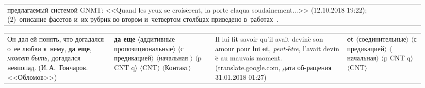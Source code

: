\begin{multicols}{2}
\begin{enumerate}[(1)]
\begin{table*}
\begin{center}
\begin{tabular}{|p{57mm}|p{23mm}|p{38mm}|p{25mm}|}
{предлагаемый системой GNMT: <<Quand les yeux se crois$\grave{\mbox{e}}$rent, la porte claqua 
soudainement$\ldots$>> (12.10.2018 19:22);
(2)~описание фасетов и~их рубрик во втором и~четвертом столбцах 
приведено в~работах~\cite{8-gz, 17-gz}.}
    \end{tabular}
    \end{center}
\begin{center}
\vspace*{2ex}


\begin{tabular}{|p{50.2mm}|p{31mm}|p{42mm}|p{26mm}|}
\hline
Он дал ей понять, что догадался о~ее любви к~нему, 
\textbf{да еще}, \textit{может быть,} 
догадался невпопад.\newline
\newline
\newline
\newline
\newline
(И.\,А.~Гончаров. <<Обломов>>)&\textbf{да еще}\newline
$\langle$аддитивные\newline
 пропозициональные$\rangle$\newline
$\langle$с предикацией$\rangle$\newline
$\langle$начальная $\rangle$\newline
$\langle$p CNT q$\rangle$\newline
$\langle$CNT$\rangle$\newline
$\langle$Контакт$\rangle$
&Il lui fit savoir qu'il avait devin$\acute{\mbox{e}}$ son amour pour lui \textbf{et},  
\textit{peut-$\hat{\mbox{e}}$tre}, l'avait devin$\acute{\mbox{e}}$ au mauvais moment.\newline
\newline
\newline
(translate.google.com, дата об-\linebreak ращения 31.01.2018 01:27)&\textbf{et}\newline 
$\langle$соединительные$\rangle$\newline
$\langle$с предикацией$\rangle$\newline
$\langle$начальная$\rangle$\newline
$\langle$p CNT q$\rangle$\newline
$\langle$CNT$\rangle$\newline

\end{tabular}
\end{center}
\end{table*}
\end{enumerate}
\end{multicols}
